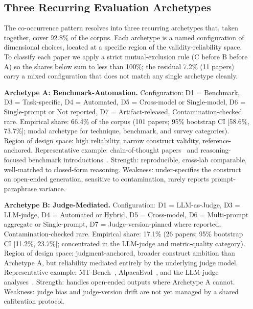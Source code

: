 \documentclass[acmsmall, nonacm, screen]{acmart}
\begin{document}
\subsection{Three Recurring Evaluation Archetypes}
\label{subsec:archetypes}

The co-occurrence pattern resolves into three recurring archetypes
that, taken together, cover 92.8\% of the corpus. Each archetype is a
named configuration of dimensional choices, located at a specific
region of the validity-reliability space. To classify each paper we
apply a strict mutual-exclusion rule (C before B before A) so the
shares below sum to less than 100\%; the residual 7.2\% (11 papers)
carry a mixed configuration that does not match any single archetype
cleanly.

\textbf{Archetype A: Benchmark-Automation.}
Configuration: D1 = Benchmark, D3 = Task-specific, D4 = Automated,
D5 = Cross-model or Single-model, D6 = Single-prompt or
Not reported, D7 = Artifact-released, Contamination-checked rare.
Empirical share: 66.4\% of the corpus (101 papers; 95\% bootstrap CI
[58.6\%, 73.7\%]; modal archetype for technique, benchmark, and survey
categories). Region of design space: high reliability, narrow
construct validity, reference-anchored. Representative example:
chain-of-thought papers~\cite{wei2022chain, wang2023selfconsistency}
and reasoning-focused benchmark
introductions~\cite{hendrycks2021measuring, srivastava2022bigbench}.
Strength: reproducible, cross-lab comparable, well-matched to
closed-form reasoning. Weakness: under-specifies the construct on
open-ended generation, sensitive to contamination, rarely reports
prompt-paraphrase variance.

\textbf{Archetype B: Judge-Mediated.}
Configuration: D1 = LLM-as-Judge, D3 = LLM-judge, D4 = Automated or
Hybrid, D5 = Cross-model, D6 = Multi-prompt aggregate or
Single-prompt, D7 = Judge-version-pinned where reported,
Contamination-checked rare. Empirical share: 17.1\% (26 papers; 95\%
bootstrap CI [11.2\%, 23.7\%]; concentrated in the LLM-judge and
metric-quality category). Region of design space: judgment-anchored,
broader construct ambition than Archetype A, but reliability mediated
entirely by the underlying judge model. Representative example:
MT-Bench~\cite{zheng2023judging}, AlpacaEval~\cite{dubois2024alpacaeval},
and the LLM-judge
analyses~\cite{gu2025llmjudge, feng2025sage, alternativeannotator2025}.
Strength: handles open-ended outputs where Archetype A cannot.
Weakness: judge bias and judge-version drift are not yet managed by
a shared calibration protocol.
\end{document}
